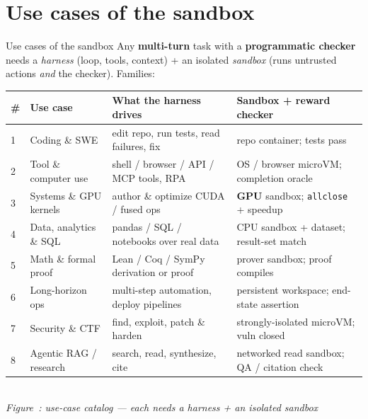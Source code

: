 \documentclass[aspectratio=169]{beamer}
\newcounter{deckfig}
\newcommand{\figtag}[1]{\refstepcounter{deckfig}%
  {\scriptsize\itshape Figure~\thedeckfig: #1}}
\begin{document}
\section{Use cases of the sandbox}

\begin{frame}{Use cases of the sandbox}
  \footnotesize Any \textbf{multi-turn} task with a \textbf{programmatic checker} needs a \emph{harness}
  (loop, tools, context) + an isolated \emph{sandbox} (runs untrusted actions \emph{and} the checker). Families:
  \begin{center}
  \renewcommand{\arraystretch}{0.95}\scriptsize
  \begin{tabular}{@{}p{0.3cm}p{2.5cm}p{4.3cm}p{4.7cm}@{}}
    \toprule
    \# & \textbf{Use case} & \textbf{What the harness drives} & \textbf{Sandbox + reward checker} \\
    \midrule
    1 & Coding \& SWE & edit repo, run tests, read failures, fix & repo container; tests pass~\cite{mbpp,swebench} \\
    2 & Tool \& computer use & shell / browser / API / MCP tools, RPA & OS / browser microVM; completion oracle \\
    3 & Systems \& GPU kernels & author \& optimize CUDA / fused ops & \textbf{GPU} sandbox; \texttt{allclose} + speedup~\cite{kernelbench} \\
    4 & Data, analytics \& SQL & pandas / SQL / notebooks over real data & CPU sandbox + dataset; result-set match \\
    5 & Math \& formal proof & Lean / Coq / SymPy derivation or proof & prover sandbox; proof compiles \\
    6 & Long-horizon ops & multi-step automation, deploy pipelines & persistent workspace; end-state assertion \\
    7 & Security \& CTF & find, exploit, patch \& harden & strongly-isolated microVM; vuln closed \\
    8 & Agentic RAG / research & search, read, synthesize, cite & networked read sandbox; QA / citation check \\
    \bottomrule
  \end{tabular}
  \\[0em]\figtag{use-case catalog --- each needs a harness + an isolated sandbox}
  \end{center}
\end{frame}
\end{document}
